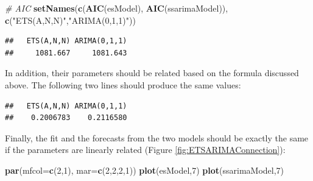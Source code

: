 \documentclass[]{book}
\newenvironment{Shaded}{\begin{snugshade}}{\end{snugshade}}
\newcommand{\CommentTok}[1]{\textcolor[rgb]{0.56,0.35,0.01}{\textit{#1}}}
\newcommand{\DataTypeTok}[1]{\textcolor[rgb]{0.13,0.29,0.53}{#1}}
\newcommand{\DecValTok}[1]{\textcolor[rgb]{0.00,0.00,0.81}{#1}}
\newcommand{\KeywordTok}[1]{\textcolor[rgb]{0.13,0.29,0.53}{\textbf{#1}}}
\newcommand{\NormalTok}[1]{#1}
\newcommand{\OperatorTok}[1]{\textcolor[rgb]{0.81,0.36,0.00}{\textbf{#1}}}
\newcommand{\StringTok}[1]{\textcolor[rgb]{0.31,0.60,0.02}{#1}}
\theoremstyle{definition}
\theoremstyle{definition}
\theoremstyle{definition}
\theoremstyle{definition}
\theoremstyle{remark}
\begin{document}
\begin{Shaded}
\begin{Highlighting}[]
\CommentTok{# AIC}
\KeywordTok{setNames}\NormalTok{(}\KeywordTok{c}\NormalTok{(}\KeywordTok{AIC}\NormalTok{(esModel), }\KeywordTok{AIC}\NormalTok{(ssarimaModel)),}
         \KeywordTok{c}\NormalTok{(}\StringTok{"ETS(A,N,N)"}\NormalTok{,}\StringTok{"ARIMA(0,1,1)"}\NormalTok{))}
\end{Highlighting}
\end{Shaded}

\begin{verbatim}
##   ETS(A,N,N) ARIMA(0,1,1) 
##     1081.667     1081.643
\end{verbatim}

In addition, their parameters should be related based on the formula discussed above. The following two lines should produce the same values:

\begin{Shaded}
\end{Shaded}

\begin{verbatim}
##   ETS(A,N,N) ARIMA(0,1,1) 
##    0.2006783    0.2116580
\end{verbatim}

Finally, the fit and the forecasts from the two models should be exactly the same if the parameters are linearly related (Figure \ref{fig:ETSARIMAConnection}):

\begin{Shaded}
\begin{Highlighting}[]
\KeywordTok{par}\NormalTok{(}\DataTypeTok{mfcol=}\KeywordTok{c}\NormalTok{(}\DecValTok{2}\NormalTok{,}\DecValTok{1}\NormalTok{), }\DataTypeTok{mar=}\KeywordTok{c}\NormalTok{(}\DecValTok{2}\NormalTok{,}\DecValTok{2}\NormalTok{,}\DecValTok{2}\NormalTok{,}\DecValTok{1}\NormalTok{))}
\KeywordTok{plot}\NormalTok{(esModel,}\DecValTok{7}\NormalTok{)}
\KeywordTok{plot}\NormalTok{(ssarimaModel,}\DecValTok{7}\NormalTok{)}
\end{Highlighting}
\end{Shaded}
\end{document}
